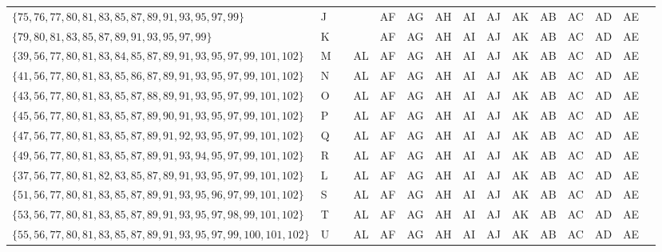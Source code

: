 \documentclass[a3paper]{report}
\begin{document}
\begin{landscape}
\begin{table}[h]
\begin{tabular}{| l | l | l | l | l | l | l | l | l | l | l | l | l | l | l |}
            $\{75,76,77,80,81,83,85,87,89,91,93,95,97,99\}$                                  & J         &        &    & AF & AG & AH & AI & AJ & AK & AB & AC & AD & AE &            \\
            $\{79,80,81,83,85,87,89,91,93,95,97,99\}$                                        & K         &        &    & AF & AG & AH & AI & AJ & AK & AB & AC & AD & AE &            \\
            $\{39,56,77,80,81,83,84,85,87,89,91,93,95,97,99,101,102\}$                       & M         &        & AL & AF & AG & AH & AI & AJ & AK & AB & AC & AD & AE &            \\
            $\{41,56,77,80,81,83,85,86,87,89,91,93,95,97,99,101,102\}$                       & N         &        & AL & AF & AG & AH & AI & AJ & AK & AB & AC & AD & AE &            \\
            $\{43,56,77,80,81,83,85,87,88,89,91,93,95,97,99,101,102\}$                       & O         &        & AL & AF & AG & AH & AI & AJ & AK & AB & AC & AD & AE &            \\
            $\{45,56,77,80,81,83,85,87,89,90,91,93,95,97,99,101,102\}$                       & P         &        & AL & AF & AG & AH & AI & AJ & AK & AB & AC & AD & AE &            \\
            $\{47,56,77,80,81,83,85,87,89,91,92,93,95,97,99,101,102\}$                       & Q         &        & AL & AF & AG & AH & AI & AJ & AK & AB & AC & AD & AE &            \\
            $\{49,56,77,80,81,83,85,87,89,91,93,94,95,97,99,101,102\}$                       & R         &        & AL & AF & AG & AH & AI & AJ & AK & AB & AC & AD & AE &            \\
            $\{37,56,77,80,81,82,83,85,87,89,91,93,95,97,99,101,102\}$                       & L         &        & AL & AF & AG & AH & AI & AJ & AK & AB & AC & AD & AE &            \\
            $\{51,56,77,80,81,83,85,87,89,91,93,95,96,97,99,101,102\}$                       & S         &        & AL & AF & AG & AH & AI & AJ & AK & AB & AC & AD & AE &            \\
            $\{53,56,77,80,81,83,85,87,89,91,93,95,97,98,99,101,102\}$                       & T         &        & AL & AF & AG & AH & AI & AJ & AK & AB & AC & AD & AE &            \\
            $\{55,56,77,80,81,83,85,87,89,91,93,95,97,99,100,101,102\}$                      & U         &        & AL & AF & AG & AH & AI & AJ & AK & AB & AC & AD & AE &            \\

\end{tabular}
\end{table}
\end{landscape}
\end{document}
